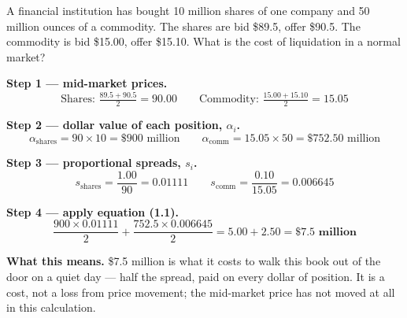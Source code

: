 \gapbadge
{}

\begin{lrexbox}
A financial institution has bought 10 million shares of one company and 50 million ounces of a commodity. The shares are bid \$89.5, offer \$90.5. The commodity is bid \$15.00, offer \$15.10. What is the cost of liquidation in a normal market?

\tcblower
\textbf{Step 1 — mid-market prices.}
\[ \text{Shares: } \tfrac{89.5+90.5}{2} = 90.00 \qquad \text{Commodity: } \tfrac{15.00+15.10}{2} = 15.05 \]

\textbf{Step 2 — dollar value of each position, $\alpha_i$.}
\[ \alpha_{\text{shares}} = 90 \times 10 = \$900\text{ million} \qquad
   \alpha_{\text{comm}} = 15.05 \times 50 = \$752.50\text{ million} \]

\textbf{Step 3 — proportional spreads, $s_i$.}
\[ s_{\text{shares}} = \frac{1.00}{90} = 0.01111 \qquad
   s_{\text{comm}} = \frac{0.10}{15.05} = 0.006645 \]

\textbf{Step 4 — apply equation (1.1).}
\[ \frac{900 \times 0.01111}{2} + \frac{752.5 \times 0.006645}{2} = 5.00 + 2.50 = \mathbf{\$7.5\text{ million}} \]

\textbf{What this means.} \$7.5 million is what it costs to walk this book out of the door on a quiet day — half the spread, paid on every dollar of position. It is a cost, not a loss from price movement; the mid-market price has not moved at all in this calculation.
\end{lrexbox}

